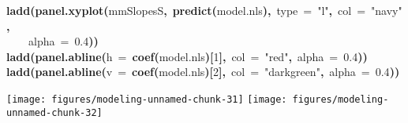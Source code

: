 \documentclass{article}\usepackage{graphicx, color}
\makeatletter
\newcommand{\hlnumber}[1]{\textcolor[rgb]{0,0,0}{#1}}%
\newcommand{\hlfunctioncall}[1]{\textcolor[rgb]{0.501960784313725,0,0.329411764705882}{\textbf{#1}}}%
\newcommand{\hlstring}[1]{\textcolor[rgb]{0.6,0.6,1}{#1}}%
\newcommand{\hlkeyword}[1]{\textcolor[rgb]{0,0,0}{\textbf{#1}}}%
\newcommand{\hlargument}[1]{\textcolor[rgb]{0.690196078431373,0.250980392156863,0.0196078431372549}{#1}}%
\newcommand{\hlsymbol}[1]{\textcolor[rgb]{0,0,0}{#1}}%
\newcommand{\hlstd}[1]{\textcolor[rgb]{0,0,0}{#1}}%
\newenvironment{kframe}{%
 \def\FrameCommand##1{\hskip\@totalleftmargin \hskip-\fboxsep
 \colorbox{shadecolor}{##1}\hskip-\fboxsep
     \hskip-\linewidth \hskip-\@totalleftmargin \hskip\columnwidth}%
 \MakeFramed {\advance\hsize-\width
   \@totalleftmargin\z@ \linewidth\hsize
   \@setminipage}}%
 {\par\unskip\endMakeFramed}
\newenvironment{knitrout}{}{} %
\makeatother
\begin{document}
\begin{knitrout}
\begin{kframe}
\begin{flushleft}
\hlstd{}\hlfunctioncall{ladd}\hlkeyword{(}\hlfunctioncall{panel.xyplot}\hlkeyword{(}\hlsymbol{mmSlopes}\hlkeyword{\usebox{\hlnormalsizeboxdollar}}\hlsymbol{S}\hlkeyword{,}{\ }\hlfunctioncall{predict}\hlkeyword{(}\hlsymbol{model.nls}\hlkeyword{)}\hlkeyword{,}{\ }\hlargument{type}{\ }\hlargument{=}{\ }\hlstring{"{}{}l"{}{}}\hlkeyword{,}{\ }\hlargument{col}{\ }\hlargument{=}{\ }\hlstring{"{}{}navy"{}{}}\hlkeyword{,}\hspace*{\fill}\\
\hlstd{}{\ }{\ }{\ }{\ }\hlargument{alpha}{\ }\hlargument{=}{\ }\hlnumber{0.4}\hlkeyword{)}\hlkeyword{)}\hspace*{\fill}\\
\hlstd{}\hlfunctioncall{ladd}\hlkeyword{(}\hlfunctioncall{panel.abline}\hlkeyword{(}\hlargument{h}{\ }\hlargument{=}{\ }\hlfunctioncall{coef}\hlkeyword{(}\hlsymbol{model.nls}\hlkeyword{)}\hlkeyword{[}\hlnumber{1}\hlkeyword{]}\hlkeyword{,}{\ }\hlargument{col}{\ }\hlargument{=}{\ }\hlstring{"{}{}red"{}{}}\hlkeyword{,}{\ }\hlargument{alpha}{\ }\hlargument{=}{\ }\hlnumber{0.4}\hlkeyword{)}\hlkeyword{)}\hspace*{\fill}\\
\hlstd{}\hlfunctioncall{ladd}\hlkeyword{(}\hlfunctioncall{panel.abline}\hlkeyword{(}\hlargument{v}{\ }\hlargument{=}{\ }\hlfunctioncall{coef}\hlkeyword{(}\hlsymbol{model.nls}\hlkeyword{)}\hlkeyword{[}\hlnumber{2}\hlkeyword{]}\hlkeyword{,}{\ }\hlargument{col}{\ }\hlargument{=}{\ }\hlstring{"{}{}darkgreen"{}{}}\hlkeyword{,}{\ }\hlargument{alpha}{\ }\hlargument{=}{\ }\hlnumber{0.4}\hlkeyword{)}\hlkeyword{)}\mbox{}
\normalfont
\end{flushleft}
\end{kframe}

{\centering \texttt{[image: figures/modeling-unnamed-chunk-31]} \texttt{[image: figures/modeling-unnamed-chunk-32]} 

}


\end{knitrout}
\end{document}
